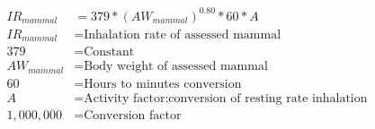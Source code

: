 \documentclass[fleqn, oneside, 11pt]{article}%
\begin{document}
\begin{preview}
\begin{align*}%
IR_{mammal} & = 379*\left(AW_{mammal}\right)^{0.80}*60*A\nonumber \\
IR_{mammal} & =  \text{Inhalation rate of assessed mammal} \nonumber \\
379 & =  \text{Constant} \nonumber \\
AW_{mammal} & =  \text{Body weight of assessed mammal} \nonumber \\
60 & =  \text{Hours to minutes conversion} \nonumber \\
A & =  \text{Activity factor:conversion of resting rate inhalation} \nonumber \\
1,000,000 & =  \text{Conversion factor} \nonumber \\
\end{align*} 
\end{preview}
\end{document}
